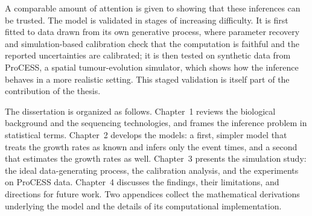 A comparable amount of attention is given to showing that these inferences can be
trusted. The model is validated in stages of increasing difficulty. It is first
fitted to data drawn from its own generative process, where parameter recovery and
simulation-based calibration check that the computation is faithful and the reported
uncertainties are calibrated; it is then tested on synthetic data from ProCESS, a
spatial tumour-evolution simulator, which shows how the inference behaves in a more realistic setting. This staged validation is itself part of
the contribution of the thesis.

The dissertation is organized as follows. Chapter~1 reviews the biological background
and the sequencing technologies, and frames the inference problem in statistical
terms. Chapter~2 develops the models: a first, simpler model that treats the growth
rates as known and infers only the event times, and a second that estimates the
growth rates as well. Chapter~3 presents the simulation study: the ideal
data-generating process, the calibration analysis, and the experiments on ProCESS
data. Chapter~4 discusses the findings, their limitations, and directions for future
work. Two appendices collect the mathematical derivations underlying the model and
the details of its computational implementation.
